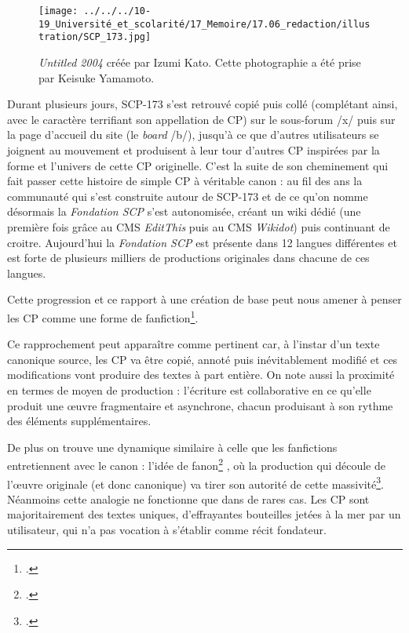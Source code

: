\documentclass[12pt,a4paper,oneside,titlepage]{article} %
\begin{document}
		\begin{wrapfigure}{l}{7cm}
		\centering
		\texttt{[image: ../../../10-19\_Université\_et\_scolarité/17\_Memoire/17.06\_redaction/illustration/SCP\_173.jpg]}
		
		\caption{\small \emph{Untitled 2004} créée par Izumi Kato. Cette photographie a été prise par Keisuke Yamamoto.}
	\end{wrapfigure}
	
	Durant plusieurs jours, SCP-173 s'est retrouvé copié puis collé (complétant ainsi, avec le caractère terrifiant son appellation de CP) sur le sous-forum /x/ puis sur la page d'accueil du site (le \textit{board} /b/), jusqu'à ce que d'autres utilisateurs se joignent au mouvement et produisent à leur tour d'autres CP inspirées par la forme et l'univers de cette CP originelle.
	C'est la suite de son cheminement qui fait passer cette histoire de simple CP à véritable canon : au fil des ans la communauté qui s'est construite autour de SCP-173 et de ce qu'on nomme désormais la \emph{Fondation SCP} s'est autonomisée, créant un wiki dédié (une première fois grâce au CMS \emph{EditThis} puis au CMS \emph{Wikidot}) puis continuant de croitre. Aujourd’hui la \emph{Fondation SCP} est présente dans 12 langues différentes et est forte de plusieurs milliers de productions originales dans chacune de ces langues. 
	
	Cette progression et ce rapport à une création de base peut nous amener à penser les CP comme une forme de fanfiction\footcite[voir p. 2]{goudet_agentivite_2021}.
	
	Ce rapprochement peut apparaître comme pertinent car, à l'instar d'un texte canonique source, les CP va être copié, annoté puis inévitablement modifié et ces modifications vont produire des textes à part entière. On note aussi la proximité en termes de moyen de production : l'écriture est collaborative en ce qu'elle produit une œuvre fragmentaire et asynchrone, chacun produisant à son rythme des éléments supplémentaires.
	
	De plus on trouve une dynamique similaire à celle que les fanfictions entretiennent avec le canon : l'idée de fanon\footcite{lata_du_2022} , où la production qui découle de l'œuvre originale (et donc canonique) va tirer son autorité de cette massivité\footcite{cook_canonicity_2013}. 
	Néanmoins cette analogie ne fonctionne que dans de rares cas. Les CP sont majoritairement des textes uniques, d'effrayantes bouteilles jetées à la mer par un utilisateur, qui n'a pas vocation à s'établir comme récit fondateur. 
	
\end{document}
